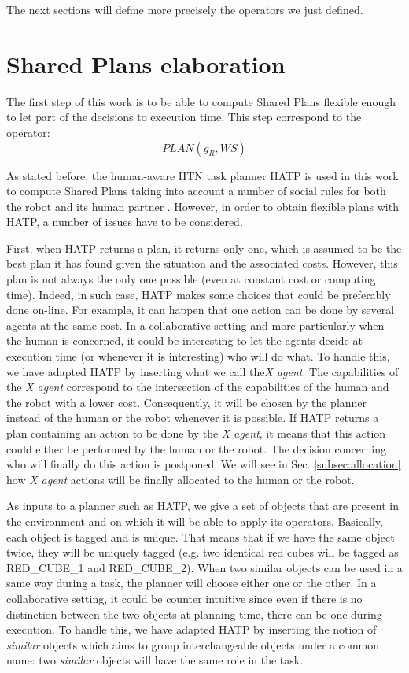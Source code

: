 \documentclass[english,a4paper,11pt,twoside]{StyleThese}
\begin{document}
The next sections will define more precisely the operators we just defined.


\section{Shared Plans elaboration}

\label{sec:elaboration}

The first step of this work is to be able to compute Shared Plans flexible enough to let part of the decisions to execution time. This step correspond to the operator:
$$PLAN(g_R, WS)$$

As stated before, the human-aware HTN task planner HATP is used in this work to compute Shared Plans taking into account a number of social rules for both the robot and its human partner \cite{Lallement2014hatp}. However, in order to obtain flexible plans with HATP, a number of issues have to be considered.

First, when HATP returns a plan, it returns only one, which is assumed to be the best plan it has found given the situation and the associated costs. However, this plan is not always the only one possible (even at constant cost or computing time). Indeed, in such case, HATP makes some choices that could be preferably done on-line. For example, it can happen that one action can be done by several agents at the same cost. In a collaborative setting and more particularly when the human is concerned, it could be interesting to let the agents decide at execution time (or whenever it is interesting) who will do what. To handle this, we have adapted HATP by inserting what we call the\textit{X agent}. The capabilities of the \textit{X agent} correspond to the intersection of the capabilities of the human and the robot with a lower cost. Consequently, it will be chosen by the planner instead of the human or the robot whenever it is possible. If HATP returns a plan containing an action to be done by the \textit{X agent}, it means that this action could either be performed by the human or the robot. The decision concerning who will finally do this action is postponed. We will see in Sec. \ref{subsec:allocation} how \textit{X agent} actions will be finally allocated to the human or the robot.

As inputs to a planner such as HATP, we give a set of objects that are present in the environment and on which it will be able to apply its operators. Basically, each object is tagged and is unique. That means that if we have the same object twice, they will be uniquely tagged (e.g. two identical red cubes will be tagged as RED\_CUBE\_1 and RED\_CUBE\_2). When two similar objects can be used in a same way during a task, the planner will choose either one or the other. In a collaborative setting, it could be counter intuitive since even if there is no distinction between the two objects at planning time, there can be one during execution. To handle this, we have adapted HATP by inserting the notion of \textit{similar} objects which aims to group interchangeable objects under a common name: two \textit{similar} objects will have the same role in the task. 
\end{document}
